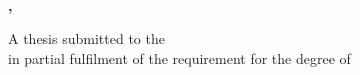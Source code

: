 

\begin{titlepage}
   \begin{center}

      \vfill
      {\LARGE\textbf{\thesistitle}}

      \vfill

      {\Large\textbf{\authorname}}

      \vfill

      {\large \textbf{\deptname}\\
         \textbf{\submissionmonth, \submissionyear}}

      \vfill

      A thesis submitted to the \schoolname \\
      in partial fulfilment of the requirement for the degree of \\
      \degreename

   \end{center}
\end{titlepage}
